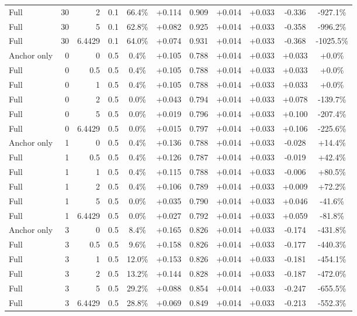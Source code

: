 \begin{table}[htbp]
\begin{tabular}{lrrrccccccc}
Full & 30 & 2 & 0.1 & 66.4\% & +0.114 & 0.909 & +0.014 & +0.033 & -0.336 & -927.1\% \\
Full & 30 & 5 & 0.1 & 62.8\% & +0.082 & 0.925 & +0.014 & +0.033 & -0.358 & -996.2\% \\
Full & 30 & 6.4429 & 0.1 & 64.0\% & +0.074 & 0.931 & +0.014 & +0.033 & -0.368 & -1025.5\% \\
Anchor only & 0 & 0 & 0.5 & 0.4\% & +0.105 & 0.788 & +0.014 & +0.033 & +0.033 & +0.0\% \\
Full & 0 & 0.5 & 0.5 & 0.4\% & +0.105 & 0.788 & +0.014 & +0.033 & +0.033 & +0.0\% \\
Full & 0 & 1 & 0.5 & 0.4\% & +0.105 & 0.788 & +0.014 & +0.033 & +0.033 & +0.0\% \\
Full & 0 & 2 & 0.5 & 0.0\% & +0.043 & 0.794 & +0.014 & +0.033 & +0.078 & -139.7\% \\
Full & 0 & 5 & 0.5 & 0.0\% & +0.019 & 0.796 & +0.014 & +0.033 & +0.100 & -207.4\% \\
Full & 0 & 6.4429 & 0.5 & 0.0\% & +0.015 & 0.797 & +0.014 & +0.033 & +0.106 & -225.6\% \\
Anchor only & 1 & 0 & 0.5 & 0.4\% & +0.136 & 0.788 & +0.014 & +0.033 & -0.028 & +14.4\% \\
Full & 1 & 0.5 & 0.5 & 0.4\% & +0.126 & 0.787 & +0.014 & +0.033 & -0.019 & +42.4\% \\
Full & 1 & 1 & 0.5 & 0.4\% & +0.115 & 0.788 & +0.014 & +0.033 & -0.006 & +80.5\% \\
Full & 1 & 2 & 0.5 & 0.4\% & +0.106 & 0.789 & +0.014 & +0.033 & +0.009 & +72.2\% \\
Full & 1 & 5 & 0.5 & 0.0\% & +0.035 & 0.790 & +0.014 & +0.033 & +0.046 & -41.6\% \\
Full & 1 & 6.4429 & 0.5 & 0.0\% & +0.027 & 0.792 & +0.014 & +0.033 & +0.059 & -81.8\% \\
Anchor only & 3 & 0 & 0.5 & 8.4\% & +0.165 & 0.826 & +0.014 & +0.033 & -0.174 & -431.8\% \\
Full & 3 & 0.5 & 0.5 & 9.6\% & +0.158 & 0.826 & +0.014 & +0.033 & -0.177 & -440.3\% \\
Full & 3 & 1 & 0.5 & 12.0\% & +0.153 & 0.826 & +0.014 & +0.033 & -0.181 & -454.1\% \\
Full & 3 & 2 & 0.5 & 13.2\% & +0.144 & 0.828 & +0.014 & +0.033 & -0.187 & -472.0\% \\
Full & 3 & 5 & 0.5 & 29.2\% & +0.088 & 0.854 & +0.014 & +0.033 & -0.247 & -655.5\% \\
Full & 3 & 6.4429 & 0.5 & 28.8\% & +0.069 & 0.849 & +0.014 & +0.033 & -0.213 & -552.3\% \\

\end{tabular}
\end{table}
